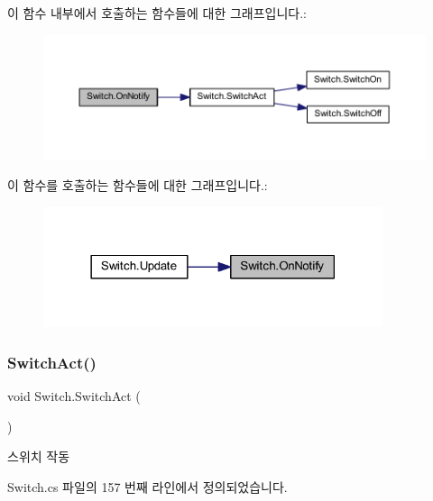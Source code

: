 이 함수 내부에서 호출하는 함수들에 대한 그래프입니다.\+:
\nopagebreak
\begin{figure}[H]
\begin{center}
\leavevmode
\includegraphics[width=350pt]{d9/d47/class_switch_a19366c58c24da5801977ecc108270c5a_cgraph}
\end{center}
\end{figure}
이 함수를 호출하는 함수들에 대한 그래프입니다.\+:
\nopagebreak
\begin{figure}[H]
\begin{center}
\leavevmode
\includegraphics[width=282pt]{d9/d47/class_switch_a19366c58c24da5801977ecc108270c5a_icgraph}
\end{center}
\end{figure}
\mbox{\label{class_switch_aa1ed0936b7074a24bbb2b46cb9a9465a}} 
\subsubsection{\texorpdfstring{SwitchAct()}{SwitchAct()}}
{\footnotesize\ttfamily void Switch.\+Switch\+Act (\begin{DoxyParamCaption}{ }\end{DoxyParamCaption})\hspace{0.3cm}{\ttfamily [private]}}



스위치 작동 



Switch.\+cs 파일의 157 번째 라인에서 정의되었습니다.


